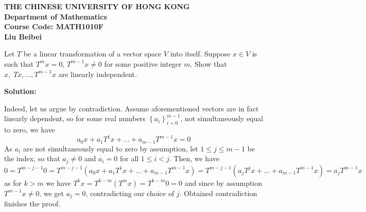 \documentclass[12pt]{article}
\newcommand{\mycbra}[1]{\left\{#1\right\}}
\begin{document}
\pagestyle{myheadings} \thispagestyle{empty} \markright{}

\begin{center}
{\bf THE CHINESE UNIVERSITY OF HONG KONG}\\
{\bf Department of Mathematics}\\
{\bf Course Code: MATH1010F}\\
{\bf Liu Beibei}\\
\end{center}

Let $T$ be a linear transformation of a vector space $V$ into itself. Suppose $x\in V$ is such that $T^mx=0$, $T^{m-1}x\neq0$ for
some positive integer $m$. Show that $x,\;Tx,\hdots,T^{m-1}x$ are linearly independent.

\textbf{Solution:}

Indeed, let us argue by contradiction. Assume aforementioned vectors are in fact linearly dependent, so for some
real numbers $\mycbra{a_i}_{i=0}^{m-1}$, not simultaneously equal to zero, we have
\[a_0x+a_1T^1x+\hdots+a_{m-1}T^{m-1}x=0\]
As $a_i$ are not simultaneously equal to zero by assumption, let $1\leq j\leq m-1$ be the index, so that $a_j\neq 0$ and
$a_i=0$ for all $1\leq i<j$. Then, we have
\[0=T^{m-j-1}0=T^{m-j-1}(a_0x+a_1T^1x+\hdots+a_{m-1}T^{m-1}x)=T^{m-j-1}(a_jT^jx+\hdots+a_{m-1}T^{m-1}x)=a_jT^{m-1}x\]
as for $k>m$ we have $T^kx=T^{k-m}(T^mx)=T^{k-m}0=0$ and since by assumption $T^{m-1}x\neq0$, we get $a_j=0$, contradicting
our choice of $j$. Obtained contradiction finishes the proof.
\end{document}
